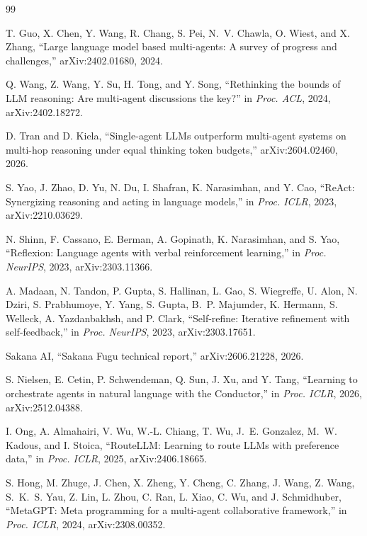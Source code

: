 \documentclass[11pt]{article}
\begin{document}
\begin{thebibliography}{99}

 T. Guo, X. Chen, Y. Wang, R. Chang, S. Pei, N.~V. Chawla, O. Wiest, and
X. Zhang, ``Large language model based multi-agents: A survey of progress and
challenges,'' arXiv:2402.01680, 2024.

 Q. Wang, Z. Wang, Y. Su, H. Tong, and Y. Song, ``Rethinking the bounds
of LLM reasoning: Are multi-agent discussions the key?'' in \textit{Proc. ACL}, 2024,
arXiv:2402.18272.

 D. Tran and D. Kiela, ``Single-agent LLMs outperform multi-agent systems
on multi-hop reasoning under equal thinking token budgets,'' arXiv:2604.02460, 2026.

 S. Yao, J. Zhao, D. Yu, N. Du, I. Shafran, K. Narasimhan, and Y. Cao,
``ReAct: Synergizing reasoning and acting in language models,'' in \textit{Proc. ICLR},
2023, arXiv:2210.03629.

 N. Shinn, F. Cassano, E. Berman, A. Gopinath, K. Narasimhan, and
S. Yao, ``Reflexion: Language agents with verbal reinforcement learning,'' in
\textit{Proc. NeurIPS}, 2023, arXiv:2303.11366.

 A. Madaan, N. Tandon, P. Gupta, S. Hallinan, L. Gao, S. Wiegreffe,
U. Alon, N. Dziri, S. Prabhumoye, Y. Yang, S. Gupta, B.~P. Majumder, K. Hermann,
S. Welleck, A. Yazdanbakhsh, and P. Clark, ``Self-refine: Iterative refinement with
self-feedback,'' in \textit{Proc. NeurIPS}, 2023, arXiv:2303.17651.

 Sakana AI, ``Sakana Fugu technical report,'' arXiv:2606.21228, 2026.

 S. Nielsen, E. Cetin, P. Schwendeman, Q. Sun, J. Xu, and Y. Tang,
``Learning to orchestrate agents in natural language with the Conductor,'' in
\textit{Proc. ICLR}, 2026, arXiv:2512.04388.

 I. Ong, A. Almahairi, V. Wu, W.-L. Chiang, T. Wu, J.~E. Gonzalez,
M.~W. Kadous, and I. Stoica, ``RouteLLM: Learning to route LLMs with preference data,'' in
\textit{Proc. ICLR}, 2025, arXiv:2406.18665.

 S. Hong, M. Zhuge, J. Chen, X. Zheng, Y. Cheng, C. Zhang, J. Wang,
Z. Wang, S.~K.~S. Yau, Z. Lin, L. Zhou, C. Ran, L. Xiao, C. Wu, and J. Schmidhuber,
``MetaGPT: Meta programming for a multi-agent collaborative framework,'' in
\textit{Proc. ICLR}, 2024, arXiv:2308.00352.


\end{thebibliography}
\end{document}

